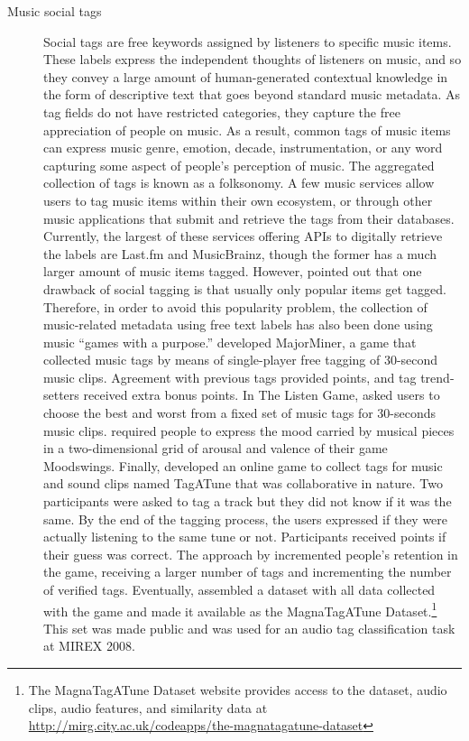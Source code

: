\begin{description}
\item [Music social tags] Social tags are free keywords assigned by listeners to specific music items. These labels express the independent thoughts of listeners on music, and so they convey a large amount of human-generated contextual knowledge in the form of descriptive text that  goes beyond standard music metadata. 
As tag fields do not have restricted categories, they capture the free appreciation of people on music. 
As a result, common tags of music items can express music genre, emotion, decade, instrumentation, or any word capturing some aspect of people's perception of music. 
The aggregated collection of tags is known as a folksonomy.  
A few music services allow users to tag music items within their own ecosystem, or through other music applications that submit and retrieve the tags from their databases. Currently, the largest of these services offering APIs to digitally retrieve the labels are Last.fm and MusicBrainz, though the former has a much larger amount of music items tagged. 
However, \textcite{lamere08social} pointed out that one drawback of social tagging is that usually only popular items get tagged.
Therefore, in order to avoid this popularity problem, the collection of music-related metadata using free text labels has also been done using  music ``games with a purpose.''
\textcite{mandel08web} developed MajorMiner, a game that collected music tags by means of single-player free tagging of 30-second music clips. Agreement with previous tags provided points, and tag trend-setters received extra bonus points.  
In The Listen Game, \textcite{turnbull07game} asked users to choose the best and worst from a fixed set of music tags for 30-seconds music clips. 
\textcite{kim08moodswings} required people to express the mood carried by musical pieces in a two-dimensional grid of arousal and valence of their game Moodswings. 
Finally, \textcite{law09input} developed an online game to collect tags for music and sound clips named TagATune that was collaborative in nature. Two participants were asked to tag a track but they did not know if it was the same. By the end of the tagging process, the users expressed if they were actually listening to the same tune or not. Participants received points if their guess was correct. 
The approach by \citeauthor{law09input} incremented people's retention in the game, receiving a larger number of tags and incrementing the number of verified tags.
Eventually, \textcite{law09evaluation} assembled a dataset with all data collected with the game and made it available as the MagnaTagATune Dataset.\footnote{The MagnaTagATune Dataset website provides access to the dataset, audio clips, audio features, and similarity data at \url{http://mirg.city.ac.uk/codeapps/the-magnatagatune-dataset}} This set was made public and was used for an audio tag classification task at MIREX 2008.




\end{description}
